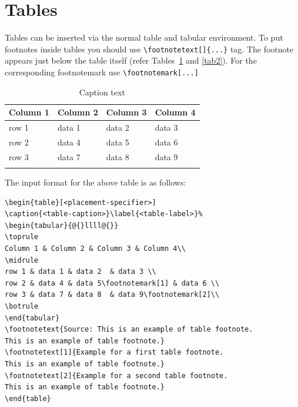 \documentclass[pdflatex,sn-mathphys-num]{sn-jnl}%
\theoremstyle{thmstyleone}%
\theoremstyle{thmstyletwo}%
\theoremstyle{thmstylethree}%
\begin{document}
\section{Tables}\label{sec5}

Tables can be inserted via the normal table and tabular environment. To put
footnotes inside tables you should use \verb+\footnotetext[]{...}+ tag.
The footnote appears just below the table itself (refer Tables~\ref{tab1} and \ref{tab2}). 
For the corresponding footnotemark use \verb+\footnotemark[...]+

\begin{table}[h]
\caption{Caption text}\label{tab1}%
\begin{tabular}{@{}llll@{}}
\toprule
Column 1 & Column 2  & Column 3 & Column 4\\
\midrule
row 1    & data 1   & data 2  & data 3  \\
row 2    & data 4   & data 5\footnotemark[1]  & data 6  \\
row 3    & data 7   & data 8  & data 9\footnotemark[2]  \\
\botrule
\end{tabular}
\end{table}

\noindent
The input format for the above table is as follows:

\bigskip
\begin{verbatim}
\begin{table}[<placement-specifier>]
\caption{<table-caption>}\label{<table-label>}%
\begin{tabular}{@{}llll@{}}
\toprule
Column 1 & Column 2 & Column 3 & Column 4\\
\midrule
row 1 & data 1 & data 2	 & data 3 \\
row 2 & data 4 & data 5\footnotemark[1] & data 6 \\
row 3 & data 7 & data 8	 & data 9\footnotemark[2]\\
\botrule
\end{tabular}
\footnotetext{Source: This is an example of table footnote. 
This is an example of table footnote.}
\footnotetext[1]{Example for a first table footnote.
This is an example of table footnote.}
\footnotetext[2]{Example for a second table footnote. 
This is an example of table footnote.}
\end{table}
\end{verbatim}
\bigskip
\end{document}
